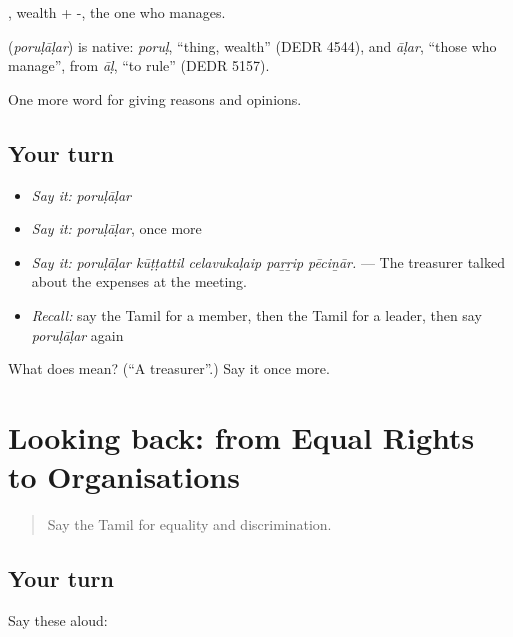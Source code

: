 , wealth + -, the one who manages.

\begin{cousinweb}
\textbf{} (\emph{poruḷāḷar}) is native: \emph{poruḷ}, \textquotedblleft{}thing, wealth\textquotedblright{} (DEDR 4544), and \emph{āḷar}, \textquotedblleft{}those who manage\textquotedblright{}, from \emph{āḷ}, \textquotedblleft{}to rule\textquotedblright{} (DEDR 5157).
\end{cousinweb}

\begin{grammarlens}[title={What you've built}]
One more word for giving reasons and opinions.
\end{grammarlens}

\subsection*{Your turn}
\begin{itemize}
\raggedright
  \item \emph{Say it:} \emph{poruḷāḷar}
  \item \emph{Say it:} \emph{poruḷāḷar}, once more
  \item \emph{Say it:} \emph{poruḷāḷar kūṭṭattil celavukaḷaip paṟṟip pēciṉār.} — The treasurer talked about the expenses at the meeting.
  \item \emph{Recall:} say the Tamil for a member, then the Tamil for a leader, then say \emph{poruḷāḷar} again
\end{itemize}

\begin{tcolorbox}[breakable,colback=teal!4,colframe=teal!35!black,title={Before you move on}]
What does  mean? (\textquotedblleft{}A treasurer\textquotedblright{}.) Say it once more.
\end{tcolorbox}
\section[(dialogue)]{Looking back: from Equal Rights to Organisations}

\label{lesson:TA-R378-review-371-378}



\begin{quote}
Say the Tamil for equality and discrimination.
\end{quote}

\subsection*{Your turn}
Say these aloud:

